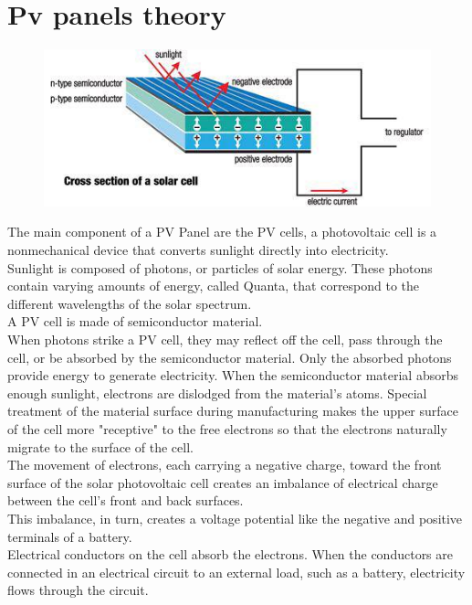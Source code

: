 \documentclass[12pt]{article}
\begin{document}
\section{Pv panels theory}
\begin{figure}[!ht]
	\centering
	\includegraphics[scale=0.4]{theory.jpg}
\end{figure}
\noindent
The main component of a PV Panel are the PV cells, a photovoltaic cell is a nonmechanical device that
converts sunlight directly into electricity.\\
Sunlight is composed of photons, or particles of solar energy.
These photons contain varying amounts of energy, called Quanta, that correspond to the different wavelengths
of the solar spectrum. \\
A PV cell is made of semiconductor material.\\
When photons strike a PV cell, they may reflect off the cell,
pass through the cell, or be absorbed by the semiconductor material. Only the absorbed photons provide
energy to generate electricity. When the semiconductor material absorbs enough sunlight, electrons are
dislodged from the material's atoms. Special treatment of the material surface during manufacturing makes
the upper surface of the cell more "receptive" to the free electrons so that the electrons naturally
migrate to the surface of the cell.\\
The movement of electrons, each carrying a negative charge, toward the front surface of the solar
photovoltaic cell creates an imbalance of electrical charge between the cell's front and back surfaces.\\
This imbalance, in turn, creates a voltage potential like the negative and positive terminals of a battery.\\
Electrical conductors on the cell absorb the electrons. When the conductors are connected in an electrical circuit to an external load,
such as a battery, electricity flows through the circuit.\\
\end{document}
